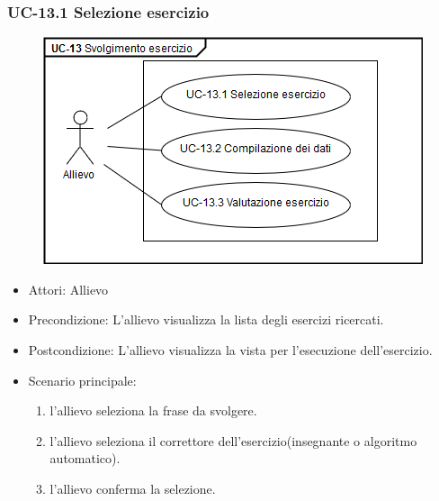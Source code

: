 	\subsubsection{UC-13.1 Selezione esercizio}
	\begin{figure}[h]
			\centering
			\includegraphics[scale=0.7]{images/UC-13_1.png}
	\end{figure}
	\begin{itemize}
			\item Attori: Allievo
			\item Precondizione: L'allievo visualizza la lista degli esercizi ricercati.
			\item Postcondizione: L'allievo visualizza la vista per l'esecuzione dell'esercizio.
			\item Scenario principale:
				\begin{enumerate}
					\item l'allievo seleziona la frase da svolgere.
					\item l'allievo seleziona il correttore dell'esercizio(insegnante o algoritmo automatico).
					\item l'allievo conferma la selezione.
				\end{enumerate}
			\end{itemize}

